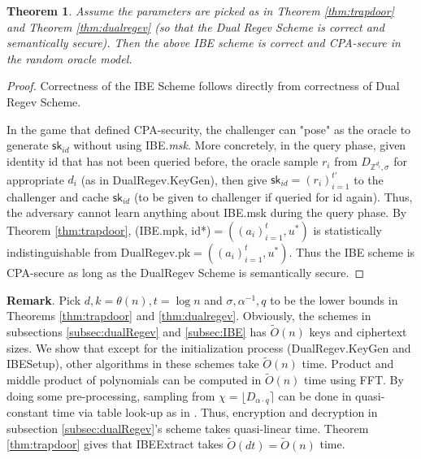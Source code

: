 \documentclass[11pt]{article}
\newcommand{\Z}{\mathbb{Z}}
\newtheorem{theorem}{Theorem}[section]
\newcommand{\sk}{\mathsf{sk}}
\begin{document}
\begin{theorem}
Assume the parameters are picked as in Theorem \ref{thm:trapdoor} and Theorem \ref{thm:dualregev} (so that the Dual Regev Scheme is correct and semantically secure). Then the above IBE scheme is correct and CPA-secure in the random oracle model.


\end{theorem}
\begin{proof}
Correctness of the IBE Scheme follows directly from correctness of Dual Regev Scheme.
 
 In the game that defined CPA-security, the challenger can "pose" as the oracle to generate $\sk_{id}$ without using IBE.\textit{msk}. More concretely, in the query phase, given identity id that has not been queried before, the oracle sample $r_i$ from $D_{\Z^{d_i}, \sigma}$ for appropriate $d_i$ (as in DualRegev.KeyGen), then give $\sk_{id} =(r_i)_{i=1}^{t'}$ to the challenger and cache $\sk_{id}$ (to be given to challenger if queried for id again). Thus, the adversary cannot learn anything about IBE.msk during the query phase. By Theorem \ref{thm:trapdoor}, (IBE.mpk, id*)$=((a_i)_{i=1}^t, u^*)$ is statistically indistinguishable from DualRegev.pk$= ((a_i)_{i=1}^t,u^*).$ Thus the IBE scheme is CPA-secure as long as the DualRegev Scheme is semantically secure.
\end{proof}
\textbf{Remark}. Pick $d, k = \theta(n), t = \log n$ and $\sigma, \alpha^{-1}, q$ to be the lower bounds in Theorems \ref{thm:trapdoor} and \ref{thm:dualregev}.  Obviously, the schemes in subsections \ref{subsec:dualRegev} and \ref{subsec:IBE} has $\tilde{O}(n)$ keys and ciphertext sizes. We show that except for the initialization process (DualRegev.KeyGen and IBESetup), other algorithms in these schemes take $\tilde{O}(n)$ time. Product and middle product of polynomials can be computed in $\tilde{O}(n)$ time using FFT. By doing some pre-processing, sampling from $\chi = \lfloor D_{\alpha\cdot q} \rceil$ can be done in quasi-constant time via table look-up as in \cite{MP}. Thus, encryption and decryption in subsection \ref{subsec:dualRegev}'s scheme takes quasi-linear time. Theorem \ref{thm:trapdoor} gives that IBEExtract takes $\tilde{O}(dt) = \tilde{O}(n)$ time. %
\end{document}
